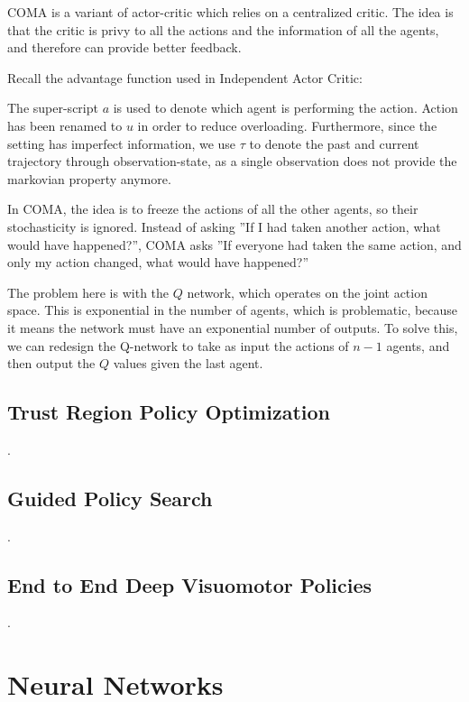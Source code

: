 \documentclass[12pt]{article}
\begin{document}
COMA is a variant of actor-critic which relies on a centralized critic. The idea is that the critic is privy to all the actions and the information of all the agents, and therefore can provide better feedback. 

Recall the advantage function used in Independent Actor Critic:


The super-script $a$ is used to denote which agent is performing the action. Action has been renamed to $u$ in order to reduce overloading. Furthermore, since the setting has imperfect information, we use $\tau$ to denote the past and current trajectory through observation-state, as a single observation does not provide the markovian property anymore.

In COMA, the idea is to freeze the actions of all the other agents, so their stochasticity is ignored. Instead of asking ''If I had taken another action, what would have happened?'', COMA asks ''If everyone had taken the same action, and only my action changed, what would have happened?''


The problem here is with the $Q$ network, which operates on the joint action space. This is exponential in the number of agents, which is problematic, because it means the network must have an exponential number of outputs. To solve this, we can redesign the Q-network to take as input the actions of $n-1$ agents, and then output the $Q$ values given the last agent. 

\subsection{Trust Region Policy Optimization}
.
\subsection{Guided Policy Search}
.
\subsection{End to End Deep Visuomotor Policies}
.

\section{Neural Networks}
\end{document}

